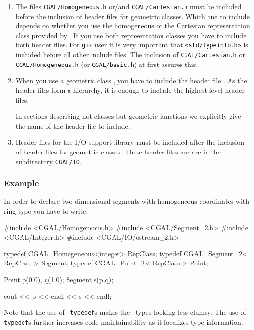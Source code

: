 \begin{enumerate}
\item  The  files {\tt CGAL/Homogeneous.h} or/and {\tt CGAL/Cartesian.h}
must be included before the inclusion of header files for geometric
classes. 
Which one to include depends on whether you use the
homogeneous or the Cartesian representation class provided by
\cgal. If you use both representation classes you have to include both
header files.
For {\tt g++} user it is very important that {\tt <std/typeinfo.h>}
is included before all other include files.
The inclusion of {\tt CGAL/Cartesian.h} or {\tt CGAL/Homogeneous.h}
(or {\tt CGAL/basic.h}) at first assures this. 

\item When you use a geometric class
,  you have to include the header file
.  As the header files form a hierarchy,
it is enough to include the highest level header files. 

In sections describing not classes but geometric functions we
explicitly give the name of the header file to include.

\item 
Header files for the I/O support library must be included after the
inclusion of header files for geometric classes. These header files
are are in the subdirectory {\tt CGAL/IO}.
\end{enumerate}

\subsubsection*{Example}

In order to declare two dimensional segments with homogeneous
coordinates with ring type  you have to write:

\begin{cprog}

#include <CGAL/Homogeneous.h>
#include <CGAL/Segment_2.h>
#include <CGAL/Integer.h>
#include <CGAL/IO/ostream_2.h>

typedef CGAL_Homogeneous<integer> RepClass;
typedef CGAL_Segment_2< RepClass  > Segment;
typedef CGAL_Point_2< RepClass > Point;

{
  Point p(0.0), q(1.0);
  Segment s(p,q);

  cout << p << endl << s << endl;
}
\end{cprog} 

Note that the use of \CC\ {\tt typedef}s makes the \cgal\ types
looking less clumsy. The use of {\tt typedef}s further increases code
maintainability as it localizes type information.

